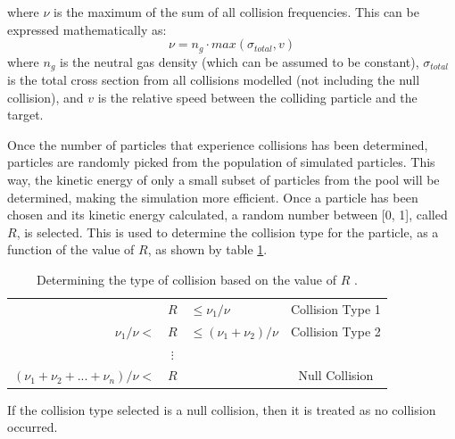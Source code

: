 where $\nu$ is the maximum of the sum of all collision frequencies. This can be expressed mathematically as:
\begin{equation}
	\nu = n_g \cdot max(\sigma_{total}, v)
	\label{eq:nu}
\end{equation}
where $n_g$ is the neutral gas density (which can be assumed to be constant), $\sigma_{total}$ is the total cross section from all collisions modelled (not including the null collision), and $v$ is the relative speed between the colliding particle and the target. 

Once the number of particles that experience collisions has been determined, particles are randomly picked from the population of simulated particles. This way, the kinetic energy of only a small subset of particles from the pool will be determined, making the simulation more efficient. Once a particle has been chosen and its kinetic energy calculated, a random number between [0, 1], called $R$, is selected. This is used to determine the collision type for the particle, as a function of the value of $R$, as shown by table \ref{tb:null_collision}. 

\begin{table}[h!]
	\caption{Determining the type of collision based on the value of $R$ \cite{Vahedi1995}.}
	\vspace{5 pt}
	\centering
	\begin{tabular}{r c l c}
					  & $R$ & $\leq \nu_1/\nu$			 & Collision Type 1 \\
		$\nu_1/\nu <$ & $R$ & $\leq (\nu_1 + \nu_2)/\nu$ & Collision Type 2 \\
					  & $\vdots$ &					     & 					\\
		$(\nu_1 + \nu_2 + ... + \nu_n)/\nu <$ & $R$ &    & Null Collision   \\
	\end{tabular}
	\label{tb:null_collision}
\end{table}

If the collision type selected is a null collision, then it is treated as no collision occurred.
